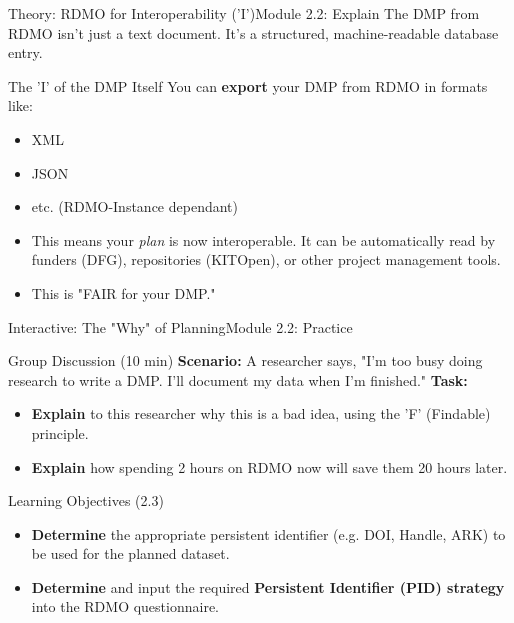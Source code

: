 \begin{frame}{Theory: RDMO for Interoperability ('I')}{Module 2.2: Explain}
    The DMP from RDMO isn't just a text document. It's a structured, machine-readable database entry.
    
    \begin{block}{The 'I' of the DMP Itself}
        You can \textbf{export} your DMP from RDMO in formats like:
        \begin{itemize}
            \item XML
            \item JSON
            \item etc. (RDMO-Instance dependant)
            \pause
            \item This means your \emph{plan} is now interoperable. It can be automatically read by funders (DFG), repositories (KITOpen), or other project management tools.
            \pause
            \item This is "FAIR for your DMP."
        \end{itemize}
    \end{block}
\end{frame}

\begin{frame}{Interactive: The "Why" of Planning}{Module 2.2: Practice}
    \begin{block}{Group Discussion (10 min)}
        \textbf{Scenario:} A researcher says, "I'm too busy doing research to write a DMP. I'll document my data when I'm finished."
        \pause
        \textbf{Task:}
        \begin{itemize}
            \item \textbf{Explain} to this researcher why this is a bad idea, using the 'F' (Findable) principle.
            \pause
            \item \textbf{Explain} how spending 2 hours on RDMO now will save them 20 hours later.
        \end{itemize}
    \end{block}
\end{frame}

\begin{frame}{Learning Objectives (2.3)}
    \begin{itemize}
        \item \textbf{Determine} the appropriate persistent identifier (e.g. DOI, Handle, ARK) to be used for the planned dataset.
        \item \textbf{Determine} and input the required \textbf{Persistent Identifier (PID) strategy} into the RDMO questionnaire.
    \end{itemize}
\end{frame}

